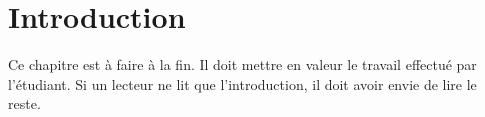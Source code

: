 \chapter*{Introduction}

Ce chapitre est à faire à la fin. Il doit mettre en valeur le travail effectué par l'étudiant. Si un lecteur ne lit que l'introduction, il doit avoir envie de lire le reste.